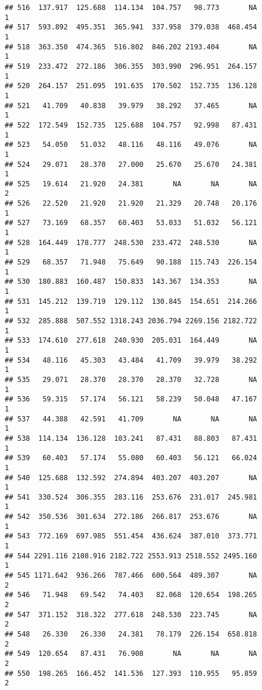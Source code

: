 \documentclass[
]{article}
\begin{document}
\begin{verbatim}
## 516  137.917  125.688  114.134  104.757   98.773       NA             1
## 517  593.892  495.351  365.941  337.958  379.038  468.454             1
## 518  363.350  474.365  516.802  846.202 2193.404       NA             1
## 519  233.472  272.186  306.355  303.990  296.951  264.157             1
## 520  264.157  251.095  191.635  170.502  152.735  136.128             1
## 521   41.709   40.838   39.979   38.292   37.465       NA             1
## 522  172.549  152.735  125.688  104.757   92.998   87.431             1
## 523   54.050   51.032   48.116   48.116   49.076       NA             1
## 524   29.071   28.370   27.000   25.670   25.670   24.381             1
## 525   19.614   21.920   24.381       NA       NA       NA             2
## 526   22.520   21.920   21.920   21.329   20.748   20.176             1
## 527   73.169   68.357   60.403   53.033   51.032   56.121             1
## 528  164.449  178.777  248.530  233.472  248.530       NA             1
## 529   68.357   71.948   75.649   90.188  115.743  226.154             1
## 530  180.883  160.487  150.833  143.367  134.353       NA             1
## 531  145.212  139.719  129.112  130.845  154.651  214.266             1
## 532  285.888  507.552 1318.243 2036.794 2269.156 2182.722             1
## 533  174.610  277.618  240.930  205.031  164.449       NA             1
## 534   48.116   45.303   43.484   41.709   39.979   38.292             1
## 535   29.071   28.370   28.370   28.370   32.728       NA             1
## 536   59.315   57.174   56.121   58.239   50.048   47.167             1
## 537   44.388   42.591   41.709       NA       NA       NA             1
## 538  114.134  136.128  103.241   87.431   88.803   87.431             1
## 539   60.403   57.174   55.080   60.403   56.121   66.024             1
## 540  125.688  132.592  274.894  403.207  403.207       NA             1
## 541  330.524  306.355  283.116  253.676  231.017  245.981             1
## 542  350.536  301.634  272.186  266.817  253.676       NA             1
## 543  772.169  697.985  551.454  436.624  387.010  373.771             1
## 544 2291.116 2108.916 2182.722 2553.913 2518.552 2495.160             1
## 545 1171.642  936.266  787.466  600.564  489.307       NA             2
## 546   71.948   69.542   74.403   82.068  120.654  198.265             2
## 547  371.152  318.322  277.618  248.530  223.745       NA             2
## 548   26.330   26.330   24.381   78.179  226.154  658.818             2
## 549  120.654   87.431   76.908       NA       NA       NA             2
## 550  198.265  166.452  141.536  127.393  110.955   95.859             2

\end{verbatim}
\end{document}
